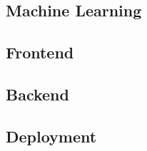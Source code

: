 \subsection{Machine Learning}


\subsection{Frontend}


\subsection{Backend}


\subsection{Deployment}
